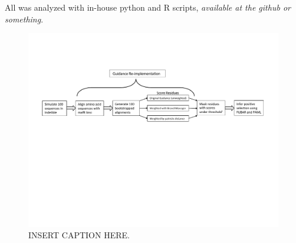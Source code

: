 \documentclass[10pt]{article}
\begin{document}
All was analyzed with in-house python and R scripts, \textit{available at the github or something}.


\begin{figure}[H]
\centerline{\includegraphics[width=7.5in]{Figures/pipeline.pdf}}
\caption{INSERT CAPTION HERE.}
\label{pipeline} 
\end{figure}
\end{document}
